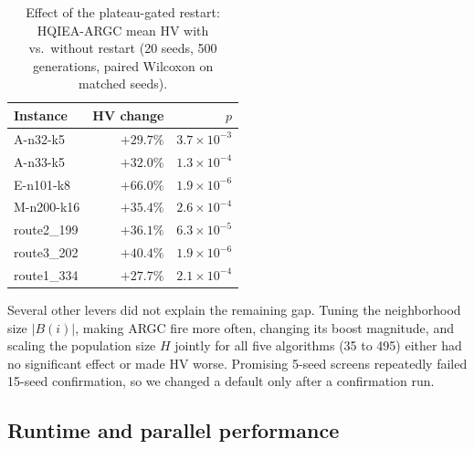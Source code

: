 \begin{table}[t]
\centering
\caption{Effect of the plateau-gated restart: HQIEA-ARGC mean HV with vs.\
without restart (20 seeds, 500 generations, paired Wilcoxon on matched seeds).}
\label{tab:restart}
\begin{tabular}{@{}lrr@{}}
\toprule
Instance & HV change & $p$ \\
\midrule
A-n32-k5    & $+29.7\%$ & $3.7\times10^{-3}$ \\
A-n33-k5    & $+32.0\%$ & $1.3\times10^{-4}$ \\
E-n101-k8   & $+66.0\%$ & $1.9\times10^{-6}$ \\
M-n200-k16  & $+35.4\%$ & $2.6\times10^{-4}$ \\
route2\_199 & $+36.1\%$ & $6.3\times10^{-5}$ \\
route3\_202 & $+40.4\%$ & $1.9\times10^{-6}$ \\
route1\_334 & $+27.7\%$ & $2.1\times10^{-4}$ \\
\bottomrule
\end{tabular}
\end{table}

Several other levers did not explain the remaining gap. Tuning the neighborhood
size $|B(i)|$, making ARGC fire more often, changing its boost magnitude, and scaling
the population size $H$ jointly for all five algorithms (35 to 495) either had no
significant effect or made HV worse. Promising 5-seed screens repeatedly failed
15-seed confirmation, so we changed a default only after a confirmation run.

\subsection{Runtime and parallel performance}
